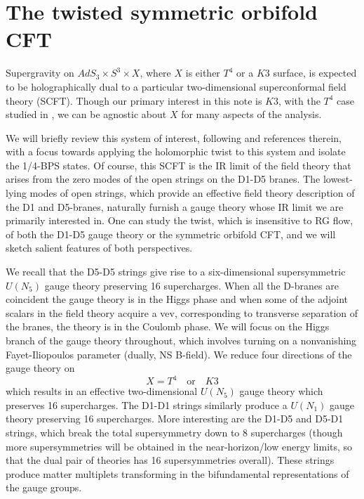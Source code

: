 \documentclass[../main.tex]{subfiles}
\begin{document}
\section{The twisted symmetric orbifold CFT}

Supergravity on $AdS_3 \times S^3 \times X$, where $X$ is either $T^4$ or a $K3$ surface, is expected to be holographically dual to a particular two-dimensional superconformal field theory (SCFT). Though our primary interest in this note is $K3$, with the $T^4$ case studied in \cite{CPT4}, we can be agnostic about $X$ for many aspects of the analysis. 

We will briefly review this system of interest, following \cite{Davidetal} and references therein, with a focus towards applying the holomorphic twist to this system and isolate the 1/4-BPS states. Of course, this SCFT is the IR limit of the field theory that arises from the zero modes of the open strings on the D1-D5 branes. 
The lowest-lying modes of open strings, which provide an effective field theory description of the D1 and D5-branes, naturally furnish a gauge theory whose IR limit we are primarily interested in. One can study the twist, which is insensitive to RG flow, of both the D1-D5 gauge theory or the symmetric orbifold CFT, and we will sketch salient features of both perspectives. 

We recall that the D5-D5 strings give rise to a six-dimensional supersymmetric $U(N_5)$ gauge theory preserving 16 supercharges. 
When all the D-branes are coincident the gauge theory is in the Higgs phase and when some of the adjoint scalars in the field theory acquire a vev, corresponding to transverse separation of the branes, the theory is in the Coulomb phase. 
We will focus on the Higgs branch of the gauge theory throughout, which involves turning on a nonvanishing Fayet-Iliopoulos parameter (dually, NS B-field). 
We reduce four directions of the gauge theory on 
\[
X = T^4 \quad \text{or} \quad K3
\]
which results in an effective two-dimensional $U(N_5)$ gauge theory which preserves 16 supercharges.
The D1-D1 strings similarly produce a $U(N_1)$ gauge theory preserving 16 supercharges. 
More interesting are the D1-D5 and D5-D1 strings, which break the total supersymmetry down to 8 supercharges (though more supersymmetries will be obtained in the near-horizon/low energy limits, so that the dual pair of theories has 16 supersymmetries overall). 
These strings produce matter multiplets transforming in the bifundamental representations of the gauge groups. 
\end{document}
